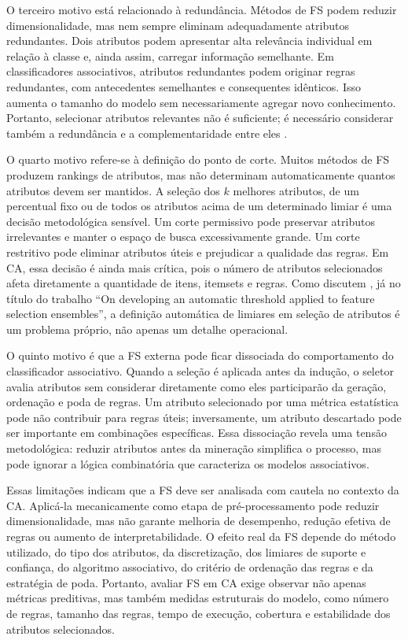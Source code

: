 O terceiro motivo está relacionado à redundância. Métodos de FS podem reduzir dimensionalidade, mas nem sempre eliminam adequadamente atributos redundantes. Dois atributos podem apresentar alta relevância individual em relação à classe e, ainda assim, carregar informação semelhante. Em classificadores associativos, atributos redundantes podem originar regras redundantes, com antecedentes semelhantes e consequentes idênticos. Isso aumenta o tamanho do modelo sem necessariamente agregar novo conhecimento. Portanto, selecionar atributos relevantes não é suficiente; é necessário considerar também a redundância e a complementaridade entre eles \cite{KHAIRE20221060,Theng2024}.

O quarto motivo refere-se à definição do ponto de corte. Muitos métodos de FS produzem rankings de atributos, mas não determinam automaticamente quantos atributos devem ser mantidos. A seleção dos $k$ melhores atributos, de um percentual fixo ou de todos os atributos acima de um determinado limiar é uma decisão metodológica sensível. Um corte permissivo pode preservar atributos irrelevantes e manter o espaço de busca excessivamente grande. Um corte restritivo pode eliminar atributos úteis e prejudicar a qualidade das regras. Em CA, essa decisão é ainda mais crítica, pois o número de atributos selecionados afeta diretamente a quantidade de itens, itemsets e regras. Como discutem , já no título do trabalho ``On developing an automatic threshold applied to feature selection ensembles'', a definição automática de limiares em seleção de atributos é um problema próprio, não apenas um detalhe operacional.

O quinto motivo é que a FS externa pode ficar dissociada do comportamento do classificador associativo. Quando a seleção é aplicada antes da indução, o seletor avalia atributos sem considerar diretamente como eles participarão da geração, ordenação e poda de regras. Um atributo selecionado por uma métrica estatística pode não contribuir para regras úteis; inversamente, um atributo descartado pode ser importante em combinações específicas. Essa dissociação revela uma tensão metodológica: reduzir atributos antes da mineração simplifica o processo, mas pode ignorar a lógica combinatória que caracteriza os modelos associativos.

Essas limitações indicam que a FS deve ser analisada com cautela no contexto da CA. Aplicá-la mecanicamente como etapa de pré-processamento pode reduzir dimensionalidade, mas não garante melhoria de desempenho, redução efetiva de regras ou aumento de interpretabilidade. O efeito real da FS depende do método utilizado, do tipo dos atributos, da discretização, dos limiares de suporte e confiança, do algoritmo associativo, do critério de ordenação das regras e da estratégia de poda. Portanto, avaliar FS em CA exige observar não apenas métricas preditivas, mas também medidas estruturais do modelo, como número de regras, tamanho das regras, tempo de execução, cobertura e estabilidade dos atributos selecionados.


